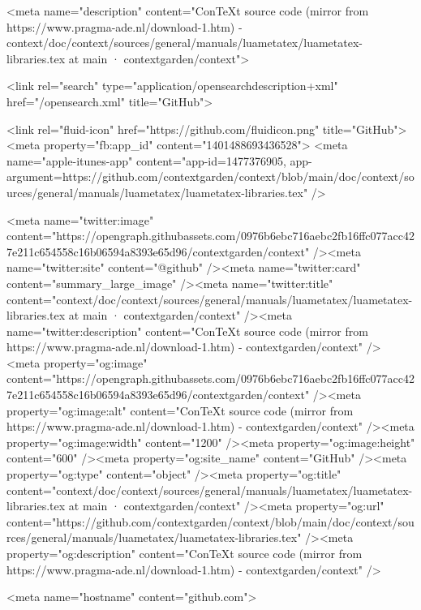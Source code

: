     

      <meta name="description" content="ConTeXt source code (mirror from https://www.pragma-ade.nl/download-1.htm) - context/doc/context/sources/general/manuals/luametatex/luametatex-libraries.tex at main · contextgarden/context">

      <link rel="search" type="application/opensearchdescription+xml" href="/opensearch.xml" title="GitHub">

    <link rel="fluid-icon" href="https://github.com/fluidicon.png" title="GitHub">
    <meta property="fb:app_id" content="1401488693436528">
    <meta name="apple-itunes-app" content="app-id=1477376905, app-argument=https://github.com/contextgarden/context/blob/main/doc/context/sources/general/manuals/luametatex/luametatex-libraries.tex" />

      <meta name="twitter:image" content="https://opengraph.githubassets.com/0976b6ebc716aebc2fb16ffc077acc427e211c654558c16b06594a8393e65d96/contextgarden/context" /><meta name="twitter:site" content="@github" /><meta name="twitter:card" content="summary_large_image" /><meta name="twitter:title" content="context/doc/context/sources/general/manuals/luametatex/luametatex-libraries.tex at main · contextgarden/context" /><meta name="twitter:description" content="ConTeXt source code (mirror from https://www.pragma-ade.nl/download-1.htm) - contextgarden/context" />
  <meta property="og:image" content="https://opengraph.githubassets.com/0976b6ebc716aebc2fb16ffc077acc427e211c654558c16b06594a8393e65d96/contextgarden/context" /><meta property="og:image:alt" content="ConTeXt source code (mirror from https://www.pragma-ade.nl/download-1.htm) - contextgarden/context" /><meta property="og:image:width" content="1200" /><meta property="og:image:height" content="600" /><meta property="og:site_name" content="GitHub" /><meta property="og:type" content="object" /><meta property="og:title" content="context/doc/context/sources/general/manuals/luametatex/luametatex-libraries.tex at main · contextgarden/context" /><meta property="og:url" content="https://github.com/contextgarden/context/blob/main/doc/context/sources/general/manuals/luametatex/luametatex-libraries.tex" /><meta property="og:description" content="ConTeXt source code (mirror from https://www.pragma-ade.nl/download-1.htm) - contextgarden/context" />
  




      <meta name="hostname" content="github.com">



